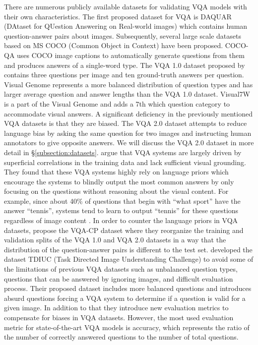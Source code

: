 \documentclass{article}
\begin{document}
There are numerous publicly available datasets for validating VQA models with their own characteristics. The first proposed dataset for VQA is DAQUAR (DAtaset for QUestion Answering on Real-world images) \citep{malinowski2014vqa} which contains human question-answer pairs about images. Subsequently, several large scale datasets based on MS COCO (Common Object in Context) \citep{coco} have been proposed. COCO-QA \cite{ren2015exploring} uses COCO image captions to automatically generate questions from them and produces answers of a single-word type. The VQA 1.0 dataset proposed by \cite{antol2015vqa} contains three questions per image and ten ground-truth answers per question. Visual Genome \citep{krishnavisualgenome} represents a more balanced distribution of question types and has larger average question and answer lengths than the VQA 1.0 dataset. Visual7W \citep{zhu2016cvpr} is a part of the Visual Genome and adds a 7th which question category to accommodate visual answers. A significant deficiency in the previously mentioned VQA datasets is that they are biased. The VQA 2.0 dataset \citep{goyal2017vqa2} attempts to reduce language bias by asking the same question for two images and instructing human annotators to give opposite answers. We will discuss the VQA 2.0 dataset in more detail in \S \ref{subsection:datasets}.
\cite{agrawal12018gvqa} argue that VQA systems are largely driven by superficial correlations in the training data and lack sufficient visual grounding. They found that these VQA systems highly rely on language priors which encourage the systems to blindly output the most common answers by only focusing on the questions without reasoning about the visual content. For example, since about 40\% of questions that begin with ``what sport'' have the answer ``tennis'', systems tend to learn to output ``tennis'' for these questions regardless of image content \citep{wu2019self}. In order to counter the language priors in VQA datasets, \cite{agrawal12018gvqa} propose the VQA-CP dataset where they reorganize the training and validation splits of the VQA 1.0 and VQA 2.0 datasets in a way that the distribution of the question-answer pairs is different to the test set.
\cite{kafle2017tdiuc} developed the dataset TDIUC (Task Directed Image Understanding Challenge) to avoid some of the limitations of previous VQA datasets such as unbalanced question types, questions that can be answered by ignoring images, and difficult evaluation process. Their proposed dataset includes more balanced questions and introduces absurd questions forcing a VQA system to determine if a question is valid for a given image. In addition to that they introduce new evaluation metrics to compensate for biases in VQA datasets. However, the most used evaluation metric for state-of-the-art VQA models is accuracy, which represents the ratio of the number of correctly answered questions to the number of total questions.
\end{document}
